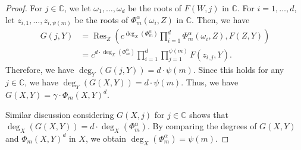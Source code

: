 \documentclass[10pt,a4paper]{amsart}
\newcommand{\Comp}{\mathbb{C}}
\newcommand{\res}{\operatorname{Res}}
\begin{document}
\begin{proof}
    For $j \in \Comp$, we let $\omega_1, \dots, \omega_d$
    be the roots of $F(W, j)$ in $\Comp$.
    For $i = 1, \dots, d$,
    let $z_{i, 1}, \dots, z_{i, \psi(m)}$ be the roots of $\Phi_m^\alpha(\omega_i, Z)$ in $\Comp$.
    Then, we have
    \begin{align*}
        G(j, Y) &= \res_Z\left(c^{\deg_X(\Phi_m^\alpha)}\prod_{i=1}^{d} \Phi_m^\alpha(\omega_i, Z), F(Z, Y)\right)\\
            &= c^{d\cdot\deg_X(\Phi_m^\alpha)} \prod_{i=1}^{d} \prod_{j=1}^{\psi(m)} F(z_{i, j}, Y).
    \end{align*}
    Therefore, we have $\deg_Y(G(j, Y)) = d \cdot \psi(m)$.
    Since this holds for any $j \in \Comp$,
    we have $\deg_Y(G(X, Y)) = d \cdot \psi(m)$.
    Thus, we have $G(X, Y) = \gamma \cdot \Phi_m(X, Y)^d$.

    Similar discussion considering $G(X, j)$ for $j \in \Comp$
    shows that $\deg_X(G(X, Y)) = d\cdot\deg_X(\Phi_m^\alpha)$.
    By comparing the degrees of $G(X, Y)$ and $\Phi_m(X, Y)^d$ in $X$,
    we obtain $\deg_X(\Phi_m^\alpha) = \psi(m)$.
\end{proof}
\end{document}

